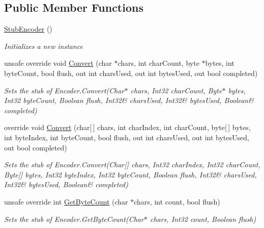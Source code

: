 \subsection*{Public Member Functions}
\begin{DoxyCompactItemize}
\item 
\hyperlink{class_system_1_1_text_1_1_fakes_1_1_stub_encoder_a59f9e5cbba6ec6f5f8dd65fe507c565f}{Stub\-Encoder} ()
\begin{DoxyCompactList}\small\item\em Initializes a new instance\end{DoxyCompactList}\item 
unsafe override void \hyperlink{class_system_1_1_text_1_1_fakes_1_1_stub_encoder_a7a20fd4095b76dbf3a1a0f77b7fe3946}{Convert} (char $\ast$chars, int char\-Count, byte $\ast$bytes, int byte\-Count, bool flush, out int chars\-Used, out int bytes\-Used, out bool completed)
\begin{DoxyCompactList}\small\item\em Sets the stub of Encoder.\-Convert(Char$\ast$ chars, Int32 char\-Count, Byte$\ast$ bytes, Int32 byte\-Count, Boolean flush, Int32\& chars\-Used, Int32\& bytes\-Used, Boolean\& completed)\end{DoxyCompactList}\item 
override void \hyperlink{class_system_1_1_text_1_1_fakes_1_1_stub_encoder_a2b3f566cff1cc57ce925674b925086e4}{Convert} (char\mbox{[}$\,$\mbox{]} chars, int char\-Index, int char\-Count, byte\mbox{[}$\,$\mbox{]} bytes, int byte\-Index, int byte\-Count, bool flush, out int chars\-Used, out int bytes\-Used, out bool completed)
\begin{DoxyCompactList}\small\item\em Sets the stub of Encoder.\-Convert(Char\mbox{[}\mbox{]} chars, Int32 char\-Index, Int32 char\-Count, Byte\mbox{[}\mbox{]} bytes, Int32 byte\-Index, Int32 byte\-Count, Boolean flush, Int32\& chars\-Used, Int32\& bytes\-Used, Boolean\& completed)\end{DoxyCompactList}\item 
unsafe override int \hyperlink{class_system_1_1_text_1_1_fakes_1_1_stub_encoder_ae47d80c0d0db6f6183783e4ebdd2b641}{Get\-Byte\-Count} (char $\ast$chars, int count, bool flush)
\begin{DoxyCompactList}\small\item\em Sets the stub of Encoder.\-Get\-Byte\-Count(\-Char$\ast$ chars, Int32 count, Boolean flush)\end{DoxyCompactList}\item 

\end{DoxyCompactItemize}
